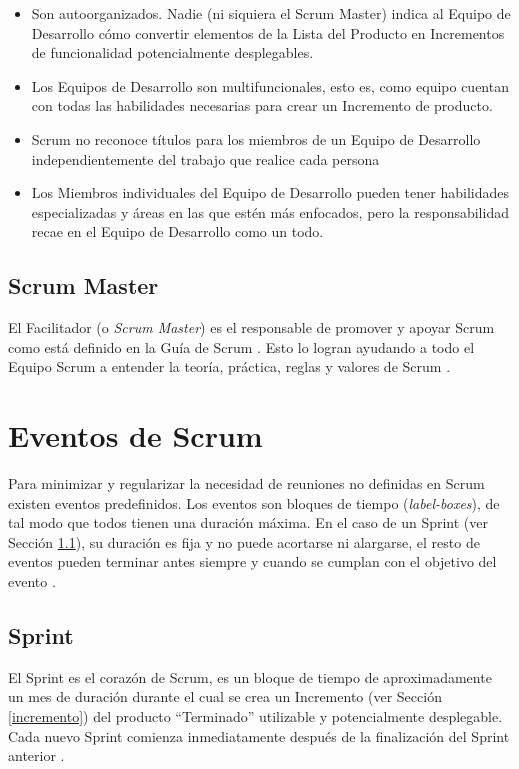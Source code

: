 \begin{itemize}
	\item Son autoorganizados. Nadie (ni siquiera el Scrum Master) indica al Equipo de Desarrollo cómo convertir elementos de la Lista del Producto en Incrementos de funcionalidad potencialmente desplegables.
	\item Los Equipos de Desarrollo son multifuncionales, esto es, como equipo cuentan con todas las habilidades necesarias para crear un Incremento de producto.
	\item Scrum no reconoce títulos para los miembros de un Equipo de Desarrollo independientemente del trabajo que realice cada persona
	\item Los Miembros individuales del Equipo de Desarrollo pueden tener habilidades especializadas y áreas en las que estén más enfocados, pero la responsabilidad recae en el Equipo de Desarrollo como un todo. 
\end{itemize}


\subsection{Scrum Master} \label{scrumMaster}

El Facilitador (o \emph{Scrum Master}) es el responsable de promover y apoyar Scrum como está definido en la Guía de Scrum \cite{scrumSchwaber}. Esto lo logran ayudando a todo el Equipo Scrum a entender la teoría, práctica, reglas y valores de Scrum \cite{scrumSchwaber}.

\section{Eventos de Scrum}

Para minimizar y regularizar la necesidad de reuniones no definidas en Scrum existen eventos predefinidos. Los eventos son bloques de tiempo (\textit{label-boxes}), de tal modo que todos tienen una duración máxima. En el caso de un Sprint (ver Sección \ref{sprint}), su duración es fija y no puede acortarse ni alargarse, el resto de eventos pueden terminar antes siempre y cuando se cumplan con el objetivo del evento \cite{scrumSchwaber}.


\subsection{Sprint} \label{sprint}
El Sprint es el corazón de Scrum, es un bloque de tiempo de aproximadamente un mes de duración durante el cual se crea un Incremento (ver Sección \ref{incremento}) del producto “Terminado” utilizable y potencialmente desplegable. Cada nuevo Sprint comienza inmediatamente después de la finalización del Sprint anterior \cite{scrumSchwaber}.


